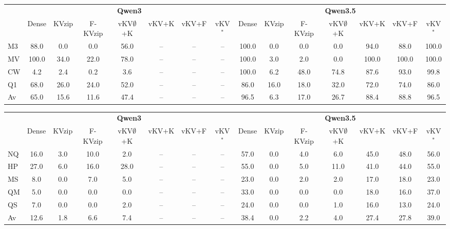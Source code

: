 \footnotesize
\setlength{\tabcolsep}{2.0pt}
\centering
\begin{tabular}{l|ccccccc|ccccccc}
\toprule
 & \multicolumn{7}{c|}{\textbf{Qwen3}} & \multicolumn{7}{c}{\textbf{Qwen3.5}} \\
 & Dense & KVzip & F-KVzip & vKV$\emptyset$+K & vKV+K & vKV+F & vKV$^\ast$ & Dense & KVzip & F-KVzip & vKV$\emptyset$+K & vKV+K & vKV+F & vKV$^\ast$ \\
\midrule
M3 & 88.0 & 0.0 & 0.0 & 56.0 & -- & -- & -- & 100.0 & 0.0 & 0.0 & 0.0 & 94.0 & 88.0 & 100.0 \\
MV & 100.0 & 34.0 & 22.0 & 78.0 & -- & -- & -- & 100.0 & 3.0 & 2.0 & 0.0 & 100.0 & 100.0 & 100.0 \\
CW & 4.2 & 2.4 & 0.2 & 3.6 & -- & -- & -- & 100.0 & 6.2 & 48.0 & 74.8 & 87.6 & 93.0 & 99.8 \\
Q1 & 68.0 & 26.0 & 24.0 & 52.0 & -- & -- & -- & 86.0 & 16.0 & 18.0 & 32.0 & 72.0 & 74.0 & 86.0 \\
\midrule
Av & 65.0 & 15.6 & 11.6 & 47.4 & -- & -- & -- & 96.5 & 6.3 & 17.0 & 26.7 & 88.4 & 88.8 & 96.5 \\
\bottomrule
\end{tabular}
\vspace{0.9em}

\begin{tabular}{l|ccccccc|ccccccc}
\toprule
 & \multicolumn{7}{c|}{\textbf{Qwen3}} & \multicolumn{7}{c}{\textbf{Qwen3.5}} \\
 & Dense & KVzip & F-KVzip & vKV$\emptyset$+K & vKV+K & vKV+F & vKV$^\ast$ & Dense & KVzip & F-KVzip & vKV$\emptyset$+K & vKV+K & vKV+F & vKV$^\ast$ \\
\midrule
NQ & 16.0 & 3.0 & 10.0 & 2.0 & -- & -- & -- & 57.0 & 0.0 & 4.0 & 6.0 & 45.0 & 48.0 & 56.0 \\
HP & 27.0 & 6.0 & 16.0 & 28.0 & -- & -- & -- & 55.0 & 0.0 & 5.0 & 11.0 & 41.0 & 44.0 & 55.0 \\
MS & 8.0 & 0.0 & 7.0 & 5.0 & -- & -- & -- & 23.0 & 0.0 & 2.0 & 2.0 & 17.0 & 18.0 & 23.0 \\
QM & 5.0 & 0.0 & 0.0 & 0.0 & -- & -- & -- & 33.0 & 0.0 & 0.0 & 0.0 & 18.0 & 16.0 & 37.0 \\
QS & 7.0 & 0.0 & 0.0 & 2.0 & -- & -- & -- & 24.0 & 0.0 & 0.0 & 1.0 & 16.0 & 13.0 & 24.0 \\
\midrule
Av & 12.6 & 1.8 & 6.6 & 7.4 & -- & -- & -- & 38.4 & 0.0 & 2.2 & 4.0 & 27.4 & 27.8 & 39.0 \\
\bottomrule
\end{tabular}
